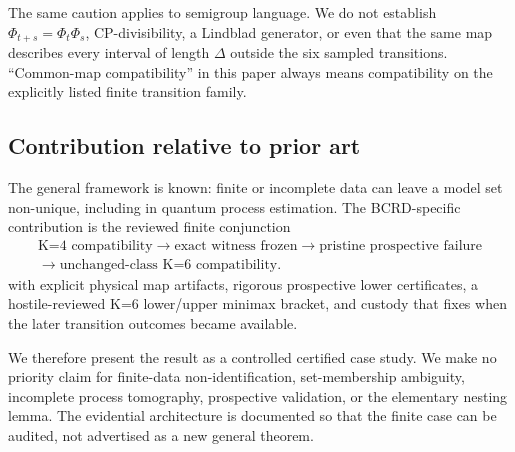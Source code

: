 The same caution applies to semigroup language.  We do not establish $\Phi_{t+s}=\Phi_t\Phi_s$, CP-divisibility, a Lindblad generator, or even that the same map describes every interval of length $\Delta$ outside the six sampled transitions.  ``Common-map compatibility'' in this paper always means compatibility on the explicitly listed finite transition family.

\subsection{Contribution relative to prior art}

The general framework is known: finite or incomplete data can leave a model set non-unique, including in quantum process estimation.  The BCRD-specific contribution is the reviewed finite conjunction
\[
\begin{gathered}
\text{K=4 compatibility}
\to
\text{exact witness frozen}
\to
\text{pristine prospective failure}
\\
\to
\text{unchanged-class K=6 compatibility}.
\end{gathered}
\]
with explicit physical map artifacts, rigorous prospective lower certificates, a hostile-reviewed K=6 lower/upper minimax bracket, and custody that fixes when the later transition outcomes became available.

We therefore present the result as a controlled certified case study.  We make no priority claim for finite-data non-identification, set-membership ambiguity, incomplete process tomography, prospective validation, or the elementary nesting lemma.  The evidential architecture is documented so that the finite case can be audited, not advertised as a new general theorem.
